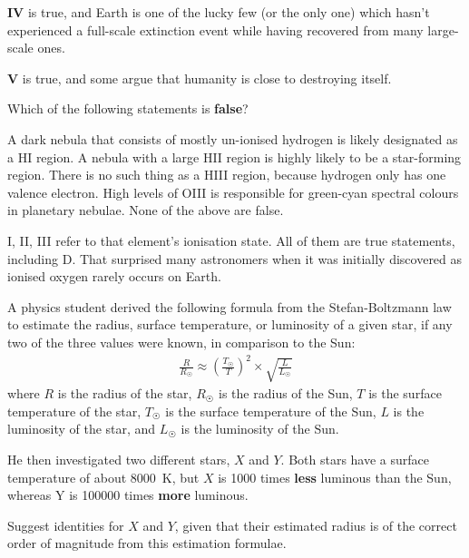 \documentclass[a4paper,11pt]{exam}
\begin{document}
\begin{questions}
\begin{solution}
		\textbf{IV} is true, and Earth is one of the lucky few (or the only one) which hasn’t experienced a full-scale extinction event while having recovered from many large-scale ones.

		\textbf{V} is true, and some argue that humanity is close to destroying itself.
	\end{solution}

\filbreak
\question
	Which of the following statements is \textbf{false}?
	\begin{choices}
		\choice A dark nebula that consists of mostly un-ionised hydrogen is likely designated as a HI region.
		\choice A nebula with a large HII region is highly likely to be a star-forming region.
		\choice There is no such thing as a HIII region, because hydrogen only has one valence electron.
		\choice High levels of OIII is responsible for green-cyan spectral colours in planetary nebulae.
		\correctchoice None of the above are false.
	\end{choices}
	\begin{solution}
		I, II, III refer to that element’s ionisation state. All of them are true statements, including D. That surprised many astronomers when it was initially discovered as ionised oxygen rarely occurs on Earth.
	\end{solution}

\filbreak
\question
	A physics student derived the following formula from the Stefan-Boltzmann law to estimate the radius, surface temperature, or luminosity of a given star, if any two of the three values were known, in comparison to the Sun:
	\begin{align*}
	\frac{R}{R_{\astrosun}} \approx \left(\frac{T_{\astrosun}}{T}\right)^2 \times \sqrt{\frac{L}{L_{\astrosun}}}
	\end{align*}
	where $ R $ is the radius of the star, $ R_{\astrosun} $ is the radius of the Sun, $ T $ is the surface temperature of the star, $ T_{\astrosun} $ is the surface temperature of the Sun, $ L $ is the luminosity of the star, and $ L_{\astrosun} $ is the luminosity of the Sun.

	He then investigated two different stars, $ X $ and $ Y $. Both stars have a surface temperature of about \SI{8000}{\K}, but $ X $ is 1000 times \textbf{less} luminous than the Sun, whereas Y is \num{100000} times \textbf{more} luminous.

	Suggest identities for $ X $ and $ Y $, given that their estimated radius is of the correct order of magnitude from this estimation formulae.


\end{questions}
\end{document}

